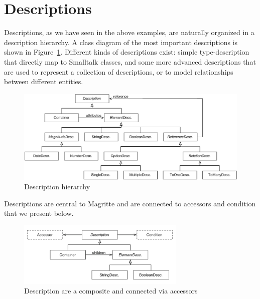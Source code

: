 \documentclass[a4paper,10pt,twoside]{book}
\begin{document}
\section{Descriptions}
Descriptions, as we have seen in the above examples, are naturally organized 
in a description hierarchy. A class diagram of the most important descriptions is shown in Figure~\ref{fig:description}. Different kinds of descriptions exist: simple 
type-description that directly map to Smalltalk classes, and some more advanced descriptions that are used to represent a collection of descriptions, or to model relationships between different entities. 


\begin{figure}
	\begin{center}
\includegraphics[width=\linewidth]{descriptionhierarchy}
\caption{Description hierarchy \label{fig:description}}
 \end{center}
\end{figure}

Descriptions are central to Magritte and are connected to accessors and condition that we present below. 
\begin{figure}
	\begin{center}
\includegraphics[width=8cm]{centralGlue}
\caption{Description are a composite and connected via accessors}
\end{center}
\end{figure}
\end{document}

